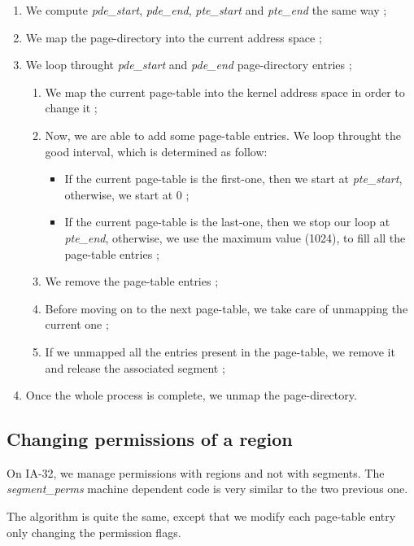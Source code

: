 \begin{enumerate}
\item We compute \textit{pde\_start}, \textit{pde\_end}, \textit{pte\_start}
and \textit{pte\_end} the same way ;
\item We map the page-directory into the current address space ;
\item We loop throught \textit{pde\_start} and \textit{pde\_end}
page-directory entries ;
  \begin{enumerate}
  \item We map the current page-table into the kernel address space in order
    to change it ;
  \item Now, we are able to add some page-table entries. We loop
  throught the good interval, which is determined as follow:
    \begin{itemize}
    \item If the current page-table is the first-one, then we start at
    \textit{pte\_start}, otherwise, we start at 0 ;
    \item If the current page-table is the last-one, then we stop our
    loop at \textit{pte\_end}, otherwise, we use the maximum value
    (1024), to fill all the page-table entries ;
    \end{itemize}
    \item We remove the page-table entries ;
    \item Before moving on to the next page-table, we take care of
    unmapping the current one ;
    \item If we unmapped all the entries present in the page-table, we
    remove it and release the associated segment ;
  \end{enumerate}
\item Once the whole process is complete, we unmap the page-directory.
\end{enumerate}

%
%

\subsection{Changing permissions of a region}

On IA-32, we manage permissions with regions and not with
segments. The \textit{segment\_perms} machine dependent code is very
similar to the two previous one.

The algorithm is quite the same, except that we modify each page-table
entry only changing the permission flags.

